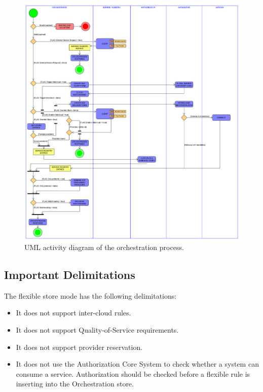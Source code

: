 \documentclass[a4paper]{arrowhead}
\begin{document}
\begin{figure}[h!]
  \centering
  \includegraphics[width=16cm]
  {figures/post_orchestration_activity_uml}
  \caption{
    UML activity diagram of the orchestration process.
  }
  \label{fig:activity_uml}
\end{figure}

\clearpage

\subsection{Important Delimitations}
\label{sec:delimitations}

The flexible store mode has the following delimitations:

\begin{itemize}
    \item It does not support inter-cloud rules.
    \item It does not support Quality-of-Service requirements.
    \item It does not support provider reservation.
    \item It does not use the Authorization Core System to check whether a system can consume a service. Authorization should be checked before a flexible rule is inserting into the Orchestration store.
\end{itemize}
\end{document}
